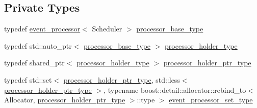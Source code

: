 \subsection*{Private Types}
\begin{DoxyCompactItemize}
\item 
typedef \mbox{\hyperlink{classboost_1_1statechart_1_1event__processor}{event\+\_\+processor}}$<$ Scheduler $>$ \mbox{\hyperlink{classboost_1_1statechart_1_1processor__container_a9d1537cda77f083b3a65a67d8ffd1f2a}{processor\+\_\+base\+\_\+type}}
\item 
typedef std\+::auto\+\_\+ptr$<$ \mbox{\hyperlink{classboost_1_1statechart_1_1processor__container_a9d1537cda77f083b3a65a67d8ffd1f2a}{processor\+\_\+base\+\_\+type}} $>$ \mbox{\hyperlink{classboost_1_1statechart_1_1processor__container_a3e774bbec52b2b0b9f0dfcde42f33b49}{processor\+\_\+holder\+\_\+type}}
\item 
typedef shared\+\_\+ptr$<$ \mbox{\hyperlink{classboost_1_1statechart_1_1processor__container_a3e774bbec52b2b0b9f0dfcde42f33b49}{processor\+\_\+holder\+\_\+type}} $>$ \mbox{\hyperlink{classboost_1_1statechart_1_1processor__container_a885e5a42694857bfaa44ec053ed20a57}{processor\+\_\+holder\+\_\+ptr\+\_\+type}}
\item 
typedef std\+::set$<$ \mbox{\hyperlink{classboost_1_1statechart_1_1processor__container_a885e5a42694857bfaa44ec053ed20a57}{processor\+\_\+holder\+\_\+ptr\+\_\+type}}, std\+::less$<$ \mbox{\hyperlink{classboost_1_1statechart_1_1processor__container_a885e5a42694857bfaa44ec053ed20a57}{processor\+\_\+holder\+\_\+ptr\+\_\+type}} $>$, typename boost\+::detail\+::allocator\+::rebind\+\_\+to$<$ Allocator, \mbox{\hyperlink{classboost_1_1statechart_1_1processor__container_a885e5a42694857bfaa44ec053ed20a57}{processor\+\_\+holder\+\_\+ptr\+\_\+type}} $>$\+::type $>$ \mbox{\hyperlink{classboost_1_1statechart_1_1processor__container_a34f8c87b6b4f8a8620c0bc6b124d0c77}{event\+\_\+processor\+\_\+set\+\_\+type}}
\end{DoxyCompactItemize}

